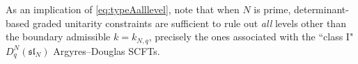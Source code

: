 As an implication of \eqref{eq:typeAalllevel}, note that when $N$ is prime, determinant-based graded unitarity constraints are sufficient to rule out \textit{all} levels other than the boundary admissible $k = k_{N,q}$, precisely the ones associated with the ``class I" $D_q^N(\mathfrak{sl}_N)$ Argyres--Douglas SCFTs. 